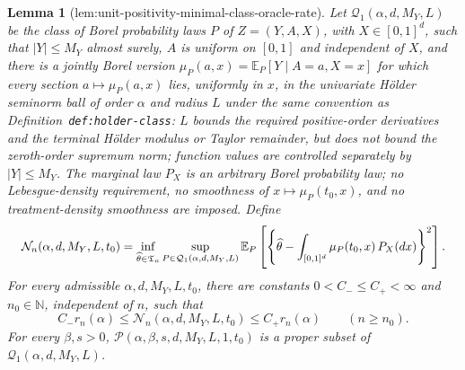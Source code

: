 \documentclass{article}
\newtheorem{lemma}{Lemma}
\begin{document}
\begin{lemma}[lem:unit-positivity-minimal-class-oracle-rate]\label{lem:unit-positivity-minimal-class-oracle-rate}
Let \(\mathcal Q_1(\alpha,d,M_Y,L)\) be the class of Borel probability laws \(P\) of \(Z=(Y,A,X)\), with \(X\in[0,1]^d\), such that \(\lvert Y\rvert\le M_Y\) almost surely, \(A\) is uniform on \([0,1]\) and independent of \(X\), and there is a jointly Borel version \(\mu_P(a,x)=\mathbb E_P[Y\mid A=a,X=x]\) for which every section \(a\mapsto\mu_P(a,x)\) lies, uniformly in \(x\), in the univariate H\"older seminorm ball of order \(\alpha\) and radius \(L\) under the same convention as Definition~\texttt{def:holder-class}: \(L\) bounds the required positive-order derivatives and the terminal H\"older modulus or Taylor remainder, but does not bound the zeroth-order supremum norm; function values are controlled separately by \(\lvert Y\rvert\le M_Y\). The marginal law \(P_X\) is an arbitrary Borel probability law; no Lebesgue-density requirement, no smoothness of \(x\mapsto\mu_P(t_0,x)\), and no treatment-density smoothness are imposed. Define
\[
\makebox[\linewidth][c]{\resizebox{0.98\linewidth}{!}{\(\displaystyle \mathcal N_n(\alpha,d,M_Y,L,t_0)
=
\inf_{\widehat\theta\in\mathfrak T_n}
\sup_{P\in\mathcal Q_1(\alpha,d,M_Y,L)}
\mathbb E_P\left[\left\{\widehat\theta-\int_{[0,1]^d}\mu_P(t_0,x)\,P_X(dx)\right\}^2\right].\)}}
\]
For every admissible \(\alpha,d,M_Y,L,t_0\), there are constants \(0<C_-\le C_+<\infty\) and \(n_0\in\mathbb N\), independent of \(n\), such that
\[
C_-r_n(\alpha)
\le
\mathcal N_n(\alpha,d,M_Y,L,t_0)
\le
C_+r_n(\alpha)
\qquad(n\ge n_0).
\]
For every \(\beta,s>0\), \(\mathcal P(\alpha,\beta,s,d,M_Y,L,1,t_0)\) is a proper subset of \(\mathcal Q_1(\alpha,d,M_Y,L)\).
\end{lemma}
\end{document}
